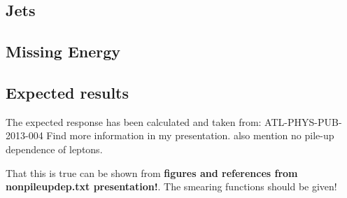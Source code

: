 \subsection{Jets}
\subsection{Missing Energy}




\subsection{Expected results}\label{cha:vali:sec:results:subsec:expr}

The expected response has been calculated and taken from: ATL-PHYS-PUB-2013-004
Find more information in my presentation. also mention no pile-up dependence of leptons.


That this is true can be shown from \textbf{figures and references from nonpileupdep.txt presentation!}. The smearing functions should be given! 

